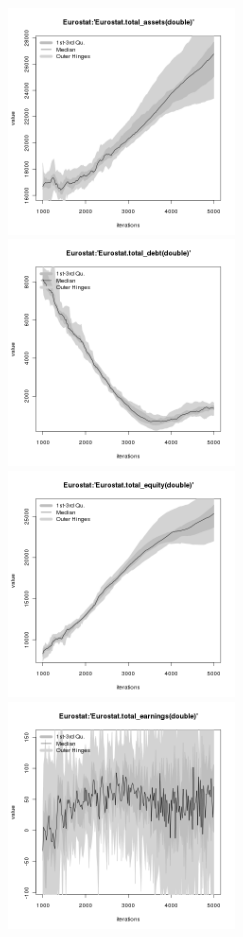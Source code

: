 \begin{figure}[H!]
\centering\leavevmode
\begin{minipage}{14cm}
\centering\leavevmode
\includegraphics[width=6cm]{./png/tax_0.10/Eurostat-total_assets.png}
\includegraphics[width=6cm]{./png/tax_0.10/Eurostat-total_debt.png}\\
\includegraphics[width=6cm]{./png/tax_0.10/Eurostat-total_equity.png}
\includegraphics[width=6cm]{./png/tax_0.10/Eurostat-total_earnings.png}\\

\end{minipage}
\end{figure}
